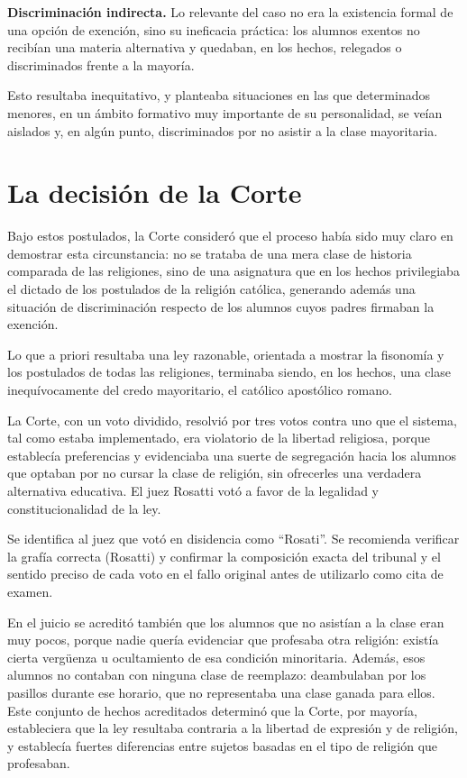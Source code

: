 \documentclass[12pt,oneside]{book}
\begin{document}
\begin{important}
\textbf{Discriminación indirecta.} Lo relevante del caso no era la existencia formal de una opción de exención, sino su ineficacia práctica: los alumnos exentos no recibían una materia alternativa y quedaban, en los hechos, relegados o discriminados frente a la mayoría.
\end{important}

Esto resultaba inequitativo, y planteaba situaciones en las que determinados menores, en un ámbito formativo muy importante de su personalidad, se veían aislados y, en algún punto, discriminados por no asistir a la clase mayoritaria.

\section{La decisión de la Corte}

Bajo estos postulados, la Corte consideró que el proceso había sido muy claro en demostrar esta circunstancia: no se trataba de una mera clase de historia comparada de las religiones, sino de una asignatura que en los hechos privilegiaba el dictado de los postulados de la religión católica, generando además una situación de discriminación respecto de los alumnos cuyos padres firmaban la exención.

Lo que a priori resultaba una ley razonable, orientada a mostrar la fisonomía y los postulados de todas las religiones, terminaba siendo, en los hechos, una clase inequívocamente del credo mayoritario, el católico apostólico romano.

La Corte, con un voto dividido, resolvió por tres votos contra uno que el sistema, tal como estaba implementado, era violatorio de la libertad religiosa, porque establecía preferencias y evidenciaba una suerte de segregación hacia los alumnos que optaban por no cursar la clase de religión, sin ofrecerles una verdadera alternativa educativa. El juez Rosatti votó a favor de la legalidad y constitucionalidad de la ley.

\begin{important}
Se identifica al juez que votó en disidencia como ``Rosati''. Se recomienda verificar la grafía correcta (Rosatti) y confirmar la composición exacta del tribunal y el sentido preciso de cada voto en el fallo original antes de utilizarlo como cita de examen.
\end{important}

En el juicio se acreditó también que los alumnos que no asistían a la clase eran muy pocos, porque nadie quería evidenciar que profesaba otra religión: existía cierta vergüenza u ocultamiento de esa condición minoritaria. Además, esos alumnos no contaban con ninguna clase de reemplazo: deambulaban por los pasillos durante ese horario, que no representaba una clase ganada para ellos. Este conjunto de hechos acreditados determinó que la Corte, por mayoría, estableciera que la ley resultaba contraria a la libertad de expresión y de religión, y establecía fuertes diferencias entre sujetos basadas en el tipo de religión que profesaban.
\end{document}
